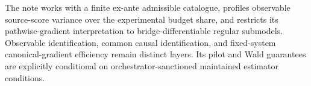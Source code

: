 The note works with a finite ex-ante admissible catalogue, profiles observable source-score variance over the experimental budget share, and restricts its pathwise-gradient interpretation to bridge-differentiable regular submodels.  Observable identification, common causal identification, and fixed-system canonical-gradient efficiency remain distinct layers.  Its pilot and Wald guarantees are explicitly conditional on orchestrator-sanctioned maintained estimator conditions.